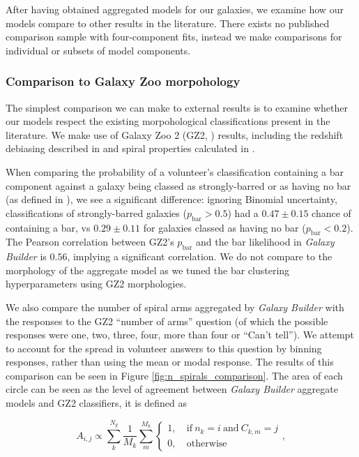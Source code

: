 \documentclass[../main.tex]{subfiles}
\begin{document}
After having obtained aggregated models for our galaxies, we examine how our models compare to other results in the literature. There exists no published comparison sample with four-component fits, instead we make comparisons for individual or subsets of model components.

\subsubsection{Comparison to Galaxy Zoo morpohology}

The simplest comparison we can make to external results is to examine whether our models respect the existing morpohological classifications present in the literature. We make use of Galaxy Zoo 2 (GZ2, \citealt{Willett2013:1308.3496v2}) results, including the redshift debiasing described in \citet{Hart2016:1607.01019v1} and spiral properties calculated in \citet{Hart2016:1607.01019v1}.

When comparing the probability of a volunteer's classification containing a bar component against a galaxy being classed as strongly-barred or as having no bar (as defined in \citealt{Masters2010:1003.0449v2}), we see a significant difference: ignoring Binomial uncertainty, classifications of strongly-barred galaxies ($p_\text{bar} > 0.5$) had a $0.47 \pm 0.15$ chance of containing a bar, vs $0.29 \pm 0.11$ for galaxies classed as having no bar ($p_\text{bar} < 0.2$). The Pearson correlation between GZ2's $p_\text{bar}$ and the bar likelihood in \textit{Galaxy Builder} is $0.56$, implying a significant correlation. We do not compare to the morphology of the aggregate model as we tuned the bar clustering hyperparameters using GZ2 morphologies.

We also compare the number of spiral arms aggregated by \textit{Galaxy Builder} with the responses to the GZ2 ``number of arms'' question (of which the possible responses were one, two, three, four, more than four or ``Can't tell''). We attempt to account for the spread in volunteer answers to this question by binning responses, rather than using the mean or modal response. The results of this comparison can be seen in Figure \ref{fig:n_spirals_comparison}. The area of each circle can be seen as the level of agreement between \textit{Galaxy Builder} aggregate models and GZ2 classifiers, it is defined as

\begin{equation}
  \label{eq:spiral_circle_area_size}
  A_{i, j} \propto \sum_{k}^{N_g}\frac{1}{M_k}\sum_{m}^{M_k}
  \begin{cases}
    1,&\ \mathrm{if}\ n_k = i\ \mathrm{and}\ C_{k, m} = j\\
    0,&\ \mathrm{otherwise}
  \end{cases},
\end{equation}
\end{document}
